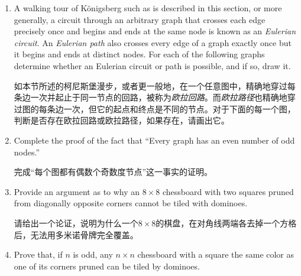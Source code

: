 \begin{enumerate}

    \item A walking tour of K\"{o}nigsberg such as is described in this section,
    or more generally, a circuit through an arbitrary graph that crosses each
    edge precisely once and begins and ends at the same node is known as
    an  \emph{Eulerian circuit}.  An  \emph{Eulerian path} also crosses every edge of a graph exactly
    once but it begins and ends at distinct nodes.  For each of the following
    graphs determine whether an Eulerian circuit or path is possible, and if so,
    draw it.
    
    \noindent 如本节所述的柯尼斯堡漫步，或者更一般地，在一个任意图中，精确地穿过每条边一次并起止于同一节点的回路，被称为\emph{欧拉回路}。而\emph{欧拉路径}也精确地穿过图的每条边一次，但它的起点和终点是不同的节点。对于下面的每一个图，判断是否存在欧拉回路或欧拉路径，如果存在，请画出它。
    
    \begin{center}
    
    \end{center}
    
    \begin{center}
    
    \end{center}
    
    \item Complete the proof of the fact that ``Every graph has an even number
    of odd nodes.''
    
    \noindent 完成“每个图都有偶数个奇数度节点”这一事实的证明。
    
    \wbvfill
    
    \item Provide an argument as 
    to why an $8 \times 8$ chessboard with 
    two squares pruned from diagonally opposite corners cannot be tiled
    with dominoes.
    
    \noindent 请给出一个论证，说明为什么一个$8 \times 8$的棋盘，在对角线两端各去掉一个方格后，无法用多米诺骨牌完全覆盖。
    
    \wbvfill
    
    \workbookpagebreak
    
    \item Prove that, if $n$ is odd, any $n \times n$ chessboard with 
    a square the same color as one of its corners pruned can be tiled by
    dominoes.
    

\end{enumerate}
